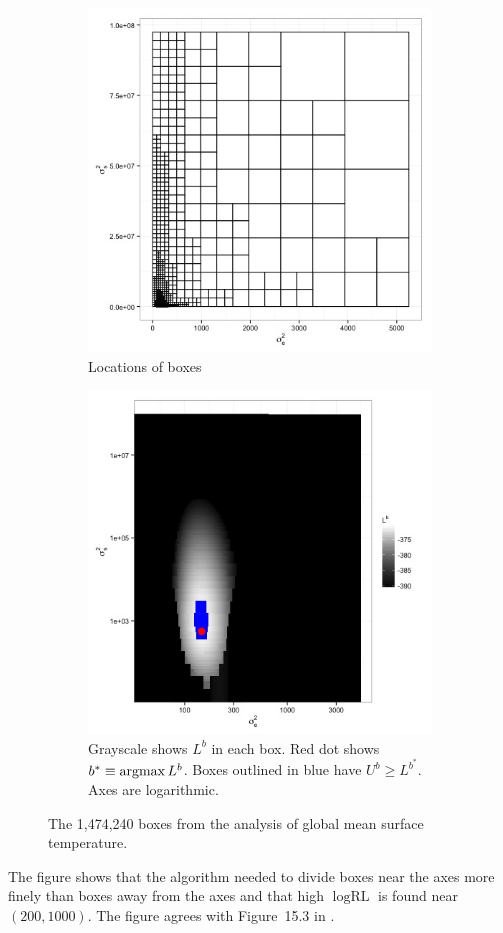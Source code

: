 \documentclass[ejs]{imsart}
\newcommand{\RLorig}{\text{RL}}
\newcommand{\logRLorig}{\log\RLorig}
\newcommand{\argmax}{\operatornamewithlimits{argmax}}
\begin{document}
\begin{figure}
  \begin{subfigure}{.5\textwidth}
    \centering
    \includegraphics[width=.8\linewidth]{figs/gmst-boxes1.jpg}
    \caption{Locations of boxes}
    \label{fig:gmst-boxes1}
  \end{subfigure}
  \begin{subfigure}{.5\textwidth}
    \centering
    \includegraphics[width=.8\linewidth]{figs/gmst-rll1.jpg}
    \caption{Grayscale shows $L^b$ in each box.
                  Red dot shows $b^* \equiv\argmax L^b$.
	          Boxes outlined in blue have $U^b \ge L^{b^*}$.
	          Axes are logarithmic.}
    \label{fig:gmstrll1}
  \end{subfigure}
  \caption{The 1,474,240 boxes from the analysis of global mean surface temperature.}
\label{fig:gmst1}
\end{figure}
The figure shows that the algorithm needed to divide boxes near the axes more finely than boxes away from the axes and that high $\logRLorig$ is found near $(200, 1000)$.  The figure agrees with Figure~15.3 in \cite{hodges:2013}.
\end{document}
